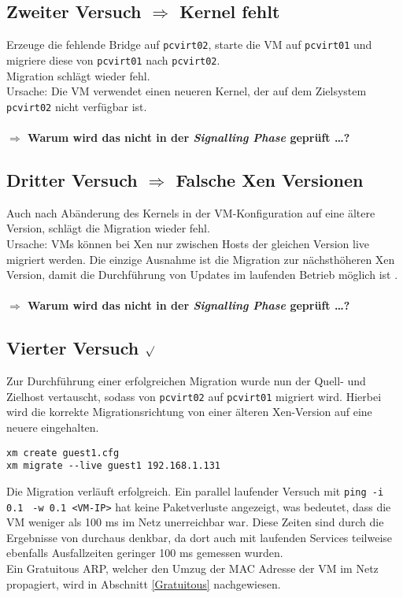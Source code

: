 \subsection {Zweiter Versuch $\Rightarrow$ Kernel fehlt}
Erzeuge die fehlende Bridge auf \verb#pcvirt02#, starte die VM auf \verb#pcvirt01# und migriere diese von \verb#pcvirt01# nach \verb#pcvirt02#.
\\
Migration schlägt wieder fehl.\\ 
Ursache: Die VM verwendet einen neueren Kernel, der auf dem Zielsystem \verb#pcvirt02# nicht verfügbar ist.
\\
\\
\large
\textbf{$\Rightarrow$ Warum wird das nicht in der \emph{Signalling Phase} geprüft \dots?}
\normalsize

\subsection {Dritter Versuch $\Rightarrow$ Falsche Xen Versionen}
Auch nach Abänderung des Kernels in der VM-Konfiguration auf eine ältere Version, schlägt die Migration wieder fehl. 
\\
Ursache: VMs können bei Xen nur zwischen Hosts der gleichen Version live migriert werden. Die einzige Ausnahme ist die Migration zur nächsthöheren Xen Version, damit die Durchführung von Updates im laufenden Betrieb möglich ist \cite{wiki_xen_version}.
\\
\\
\Large
\textbf{$\Rightarrow$ Warum wird das nicht in der \emph{Signalling Phase} geprüft \dots?}
\normalsize

\subsection {Vierter Versuch $\surd$ }
Zur Durchführung einer erfolgreichen Migration wurde nun der Quell- und Zielhost vertauscht, sodass von \verb#pcvirt02# auf \verb#pcvirt01# migriert wird. Hierbei wird die korrekte Migrationsrichtung von einer älteren Xen-Version auf eine neuere eingehalten.
\setupVerbatimOut
\begin{verbatim} 
xm create guest1.cfg
xm migrate --live guest1 192.168.1.131
\end{verbatim}

Die Migration verläuft erfolgreich. Ein parallel laufender Versuch mit \verb|ping -i 0.1| \verb| -w 0.1 <VM-IP>| hat keine Paketverluste angezeigt, was bedeutet, dass die VM weniger als 100 ms im Netz unerreichbar war. Diese Zeiten sind durch die Ergebnisse von \cite{clark2005live} durchaus denkbar, da dort auch mit laufenden Services teilweise ebenfalls Ausfallzeiten geringer 100 ms gemessen wurden.
\\
Ein Gratuitous ARP, welcher den Umzug der MAC Adresse der VM im Netz propagiert, wird in Abschnitt \ref{Gratuitous} nachgewiesen.

